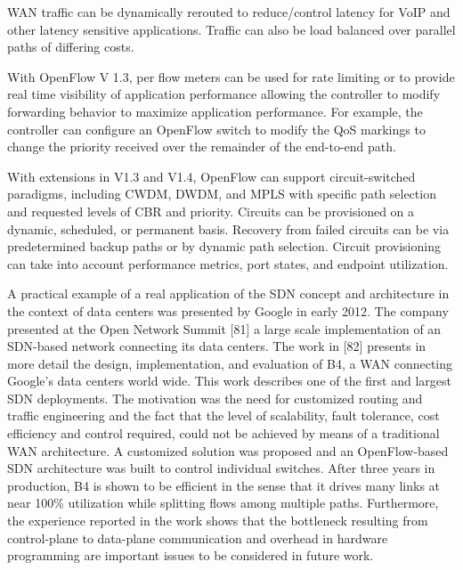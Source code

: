 WAN traffic can be dynamically rerouted to reduce/control latency for VoIP and other latency sensitive applications. Traffic can also be load balanced over parallel paths of differing costs.

With OpenFlow V 1.3, per flow meters can be used for rate limiting or to provide real time visibility of application performance allowing the controller to modify forwarding behavior to maximize application performance. For example, the controller can configure an OpenFlow switch to modify the QoS markings to change the priority received over the remainder of the end-to-end path.

With extensions in V1.3 and V1.4, OpenFlow can support circuit-switched paradigms, including CWDM, DWDM, and MPLS with specific path selection and requested levels of CBR and priority. Circuits can be provisioned on a dynamic, scheduled, or permanent basis. Recovery from failed circuits can be via predetermined backup paths or by dynamic path selection. Circuit provisioning can take into account performance metrics, port states, and endpoint utilization.

A practical example of a real application of the SDN concept and architecture in the context of data centers was presented by Google in early 2012. The company presented at the Open Network Summit [81] a large scale implementation of an SDN-based network connecting its data centers. The work in [82] presents in more detail the design, implementation, and evaluation of B4, a WAN connecting Google’s data centers world wide. This work describes one of the first and largest SDN deployments. The motivation was the need for customized routing and traffic engineering and the fact that the level of scalability, fault tolerance, cost efficiency and control required, could not be achieved by means of a traditional WAN architecture. A customized solution was proposed and an OpenFlow-based SDN architecture was built to control individual switches. After three years in production, B4 is
shown to be efficient in the sense that it drives many links at near 100\% utilization while splitting flows among multiple
paths. Furthermore, the experience reported in the work shows that the bottleneck resulting from control-plane to data-plane
communication and overhead in hardware programming are important issues to be considered in future work. \cite{SurveySDNApplications}







